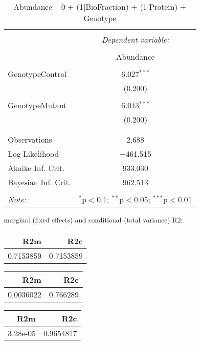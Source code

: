 \documentclass[11pt]{report}
\begin{document}
\begin{table}[!htbp] \centering 
  \caption{Abundance ~ 0 + (1|BioFraction) + (1|Protein) + Genotype} 
  \label{} 
\begin{tabular}{@{\extracolsep{5pt}}lc} 
\\[-1.8ex]\hline 
\hline \\[-1.8ex] 
 & \multicolumn{1}{c}{\textit{Dependent variable:}} \\ 
\cline{2-2} 
\\[-1.8ex] & Abundance \\ 
\hline \\[-1.8ex] 
 GenotypeControl & 6.027$^{***}$ \\ 
  & (0.200) \\ 
  & \\ 
 GenotypeMutant & 6.043$^{***}$ \\ 
  & (0.200) \\ 
  & \\ 
\hline \\[-1.8ex] 
Observations & 2,688 \\ 
Log Likelihood & $-$461.515 \\ 
Akaike Inf. Crit. & 933.030 \\ 
Bayesian Inf. Crit. & 962.513 \\ 
\hline 
\hline \\[-1.8ex] 
\textit{Note:}  & \multicolumn{1}{r}{$^{*}$p$<$0.1; $^{**}$p$<$0.05; $^{***}$p$<$0.01} \\ 
\end{tabular} 
\end{table} 
marginal (fixed effects) and conditional (total variance) R2:

\begin{tabular}{r|r}
\hline
R2m & R2c\\
\hline
0.7153859 & 0.7153859\\
\hline
\end{tabular}

\begin{tabular}{r|r}
\hline
R2m & R2c\\
\hline
0.0036022 & 0.766289\\
\hline
\end{tabular}

\begin{tabular}{r|r}
\hline
R2m & R2c\\
\hline
3.28e-05 & 0.9654817\\
\hline
\end{tabular}
\end{document}
